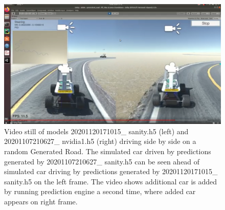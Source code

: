 \begin{figure}[ht]
 \centering 
 \includegraphics[width=\textwidth]{Figures/0627_nvidia1x1015_sanity_GenRoad.png}
 \caption{Video still of models 20201120171015\_ sanity.h5 (left) and 20201107210627\_  nvidia1.h5 (right) driving side by side on a random Generated Road. The simulated car driven by predictions generated by 20201107210627\_ sanity.h5 can be seen ahead of simulated car driving by predictions generated by 20201120171015\_ sanity.h5 on the left frame. The video shows additional car is added by running prediction engine a second time, where added car appears on right frame.}
 \label{fig:0627_nvidia1x1015_sanity_GenRoad}
\end{figure}
